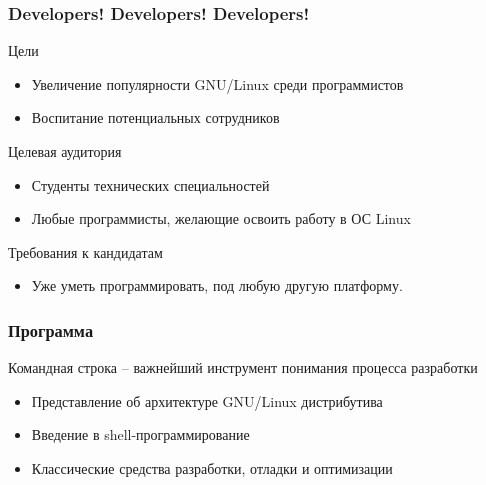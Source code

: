 \begin{frame}{}
	\Huge
\end{frame}


\begin{frame}
	\frametitle{Developers! Developers! Developers!}

	\begin{block}{Цели}
		\begin{itemize}
			\item Увеличение популярности GNU/Linux среди программистов
			\item Воспитание потенциальных сотрудников
		\end{itemize}
	\end{block}

	\pause

	\begin{block}{Целевая аудитория}
		\begin{itemize}
			\item Студенты технических специальностей
			\item Любые программисты, желающие освоить работу в ОС Linux
		\end{itemize}
	\end{block}

	\begin{block}{Требования к кандидатам}
		\begin{itemize}
			\item Уже уметь программировать, под любую другую платформу.
		\end{itemize}
	\end{block}
\end{frame}

\begin{frame}
	\frametitle{Программа}

	\begin{block}{Командная строка -- важнейший инструмент понимания процесса разработки}
		\begin{itemize}
			\item Представление об архитектуре GNU/Linux дистрибутива
			\item Введение в shell-программирование
			\item Классические средства разработки, отладки и оптимизации
		\end{itemize}
	\end{block}
\end{frame}

